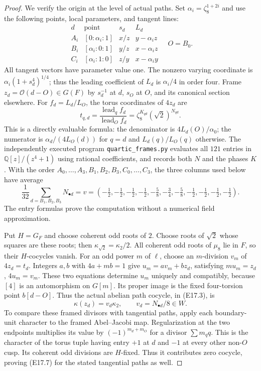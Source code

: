 \documentclass[11pt,oneside]{article}
\begin{document}
\begin{proof}
We verify the origin at the level of actual paths.
Set $\alpha_i=\zeta_8^{1+2i}$ and use the following
points, local parameters, and tangent lines:
\[
 \begin{array}{c|c|c|c}
 d&\text{point}&s_d&L_d\\\hline
 A_i&[0:\alpha_i:1]&x/z&y-\alpha_i z\\
 B_i&[\alpha_i:0:1]&y/z&x-\alpha_i z\\
 C_i&[\alpha_i:1:0]&z/y&x-\alpha_i y
 \end{array}
 \quad O=B_0 .
 \tag{E17.4}
\]
All tangent vectors have parameter value one. The
nonzero varying coordinate is
$\alpha_i(1+s_d^4)^{1/4}$; thus the leading coefficient
of $L_d$ is $\alpha_i/4$ in order four. Frame
$z_d=\mathcal O(d-O)\in G(F)$ by $s_d^{-1}$ at $d$,
$s_O$ at $O$, and its canonical section elsewhere.
For $f_d=L_d/L_O$, the torus coordinates of $4z_d$ are
\[
 t_{q,d}=
 \frac{\operatorname{lead}_q f_d}{
       \operatorname{lead}_O f_d}
       =\zeta_8^{K_{qd}}(\sqrt2)^{N_{qd}}.
 \tag{E17.5}
\]
This is a directly evaluable formula: the denominator
is $4L_d(O)/\alpha_0$; the numerator is
$\alpha_d/(4L_O(d))$ for $q=d$ and $L_d(q)/L_O(q)$
otherwise. The independently executed program
\texttt{quartic\_frames.py} evaluates all $121$ entries
in $\mathbb Q[z]/(z^4+1)$ using rational coefficients,
and records both $N$ and the phases $K$. With the order
$A_0,\ldots,A_3,B_1,B_2,B_3,C_0,\ldots,C_3$,
the three columns used below have average
\[
 \frac1{32}\sum_{d=B_1,B_2,B_3}N_{\bullet d}
 =v=\left(-\tfrac12,-\tfrac12,-\tfrac12,-\tfrac12,
 -\tfrac58,-\tfrac34,-\tfrac58,
 -\tfrac12,-\tfrac12,-\tfrac12,-\tfrac12\right).
 \tag{E17.6}
\]
The entry formulas prove the computation without a
numerical field approximation.

Put $H=G_F$ and choose coherent odd roots of $2$.
Choose roots of $\sqrt2$ whose squares are these roots;
then $\kappa_{\sqrt2}=\kappa_2/2$. All coherent odd
roots of $\mu_8$ lie in $F$, so their $H$-cocycles
vanish. For an odd power $m$ of $\ell$, choose an
$m$-division $v_m$ of $4z_d=t_d$. Integers $a,b$ with
$4a+mb=1$ give $u_m=a v_m+bz_d$, satisfying
$mu_m=z_d$, $4u_m=v_m$. These two equations determine
$u_m$ uniquely and compatibly, because $[4]$ is an
automorphism on $G[m]$. Its proper image is the fixed
four-torsion point $b[d-O]$. Thus the actual abelian
path cocycle, in (E17.3), is
\[
  \kappa(z_d)=v_d\kappa_2,
       \qquad v_d=N_{\bullet d}/8\in W .
 \tag{E17.7}
\]
To compare these framed divisors with tangential
paths, apply each boundary-unit character to the
framed Abel--Jacobi map. Regularization at the two
endpoints multiplies its value by
$(-1)^{m_d+m_O}$ for a divisor $\sum m_q q$.
This is the character of the torus tuple having
entry $+1$ at $d$ and $-1$ at every other non-$O$
cusp. Its coherent odd divisions are $H$-fixed.
Thus it contributes zero cocycle, proving (E17.7)
for the stated tangential paths as well.


\end{proof}
\end{document}
